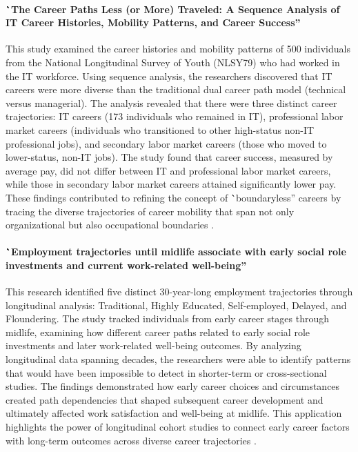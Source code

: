 \documentclass[../main.tex]{subfiles}
\begin{document}
\paragraph{\``The Career Paths Less (or More) Traveled: A Sequence Analysis of IT Career Histories, Mobility Patterns, and Career Success''}
This study examined the career histories and mobility patterns of 500 individuals from the National Longitudinal Survey of Youth (NLSY79) who had worked in the IT workforce. Using sequence analysis, the researchers discovered that IT careers were more diverse than the traditional dual career path model (technical versus managerial). The analysis revealed that there were three distinct career trajectories: IT careers (173 individuals who remained in IT), professional labor market careers (individuals who transitioned to other high-status non-IT professional jobs), and secondary labor market careers (those who moved to lower-status, non-IT jobs). The study found that career success, measured by average pay, did not differ between IT and professional labor market careers, while those in secondary labor market careers attained significantly lower pay. These findings contributed to refining the concept of \``boundaryless'' careers by tracing the diverse trajectories of career mobility that span not only organizational but also occupational boundaries \cite{joseph2012career}.

\paragraph{\``Employment trajectories until midlife associate with early social role investments and current work-related well-being''}
This research identified five distinct 30-year-long employment trajectories through longitudinal analysis: Traditional, Highly Educated, Self-employed, Delayed, and Floundering. The study tracked individuals from early career stages through midlife, examining how different career paths related to early social role investments and later work-related well-being outcomes. By analyzing longitudinal data spanning decades, the researchers were able to identify patterns that would have been impossible to detect in shorter-term or cross-sectional studies. The findings demonstrated how early career choices and circumstances created path dependencies that shaped subsequent career development and ultimately affected work satisfaction and well-being at midlife. This application highlights the power of longitudinal cohort studies to connect early career factors with long-term outcomes across diverse career trajectories \cite{kokko2013employment}.
\end{document}
